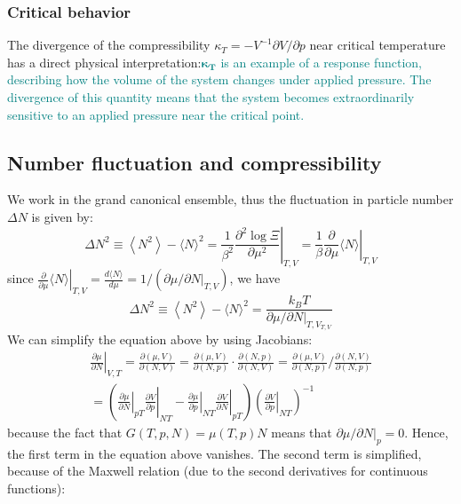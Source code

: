\documentclass[12pt,titlepage]{article}
\newcommand{\tealp}[1]{\textcolor{teal}{#1}}
\numberwithin{equation}{section}
\begin{document}
\subsubsection{Critical behavior}
The divergence of the compressibility $\kappa_{T}=-V^{-1} \partial V / \partial p$ near critical temperature has a direct physical interpretation:\tealp{$\boldsymbol{\kappa}_{\boldsymbol{T}}$ is an example of a response function\index{response function}, describing how the volume of the system changes under applied pressure. The divergence of this quantity means that the system becomes extraordinarily sensitive to an applied pressure near the critical point.}

\subsection{Number fluctuation and compressibility}
We work in the grand canonical ensemble, thus the fluctuation in particle number $\Delta N$ is given by:
\begin{equation}
\Delta N^{2} \equiv\left\langle N^{2}\right\rangle-\langle N\rangle^{2}=\left.\frac{1}{\beta^{2}} \frac{\partial^{2} \log \Xi}{\partial \mu^{2}}\right|_{T, V}=\left.\frac{1}{\beta} \frac{\partial}{\partial \mu}\langle N\rangle\right|_{T, V}
\end{equation}
since $\left.\frac{\partial}{\partial \mu}\langle N\rangle\right|_{T, V}=\frac{d\langle N\rangle}{d \mu}=1/(\left.\partial \mu / \partial N\right|_{T, V})$, we have
\begin{equation}
\Delta N^{2} \equiv\left\langle N^{2}\right\rangle-\langle N\rangle^{2}=\frac{k_{B} T}{\left.\partial \mu / \partial N\right|_{T, V_ { T , V }}}
\end{equation}
We can simplify the equation above by using Jacobians:
\begin{multline}
    \left.\frac{\partial \mu}{\partial N}\right|_{V, T} =\frac{\partial(\mu, V)}{\partial(N, V)} =\frac{\partial(\mu, V)}{\partial(N, p)} \cdot \frac{\partial(N, p)}{\partial(N, V)} =\frac{\partial(\mu, V)}{\partial(N, p)} / \frac{\partial(N, V)}{\partial(N, p)}\\
     =\left(\left.\left.\frac{\partial \mu}{\partial N}\right|_{p T} \frac{\partial V}{\partial p}\right|_{N T}-\left.\left.\frac{\partial \mu}{\partial p}\right|_{N T} \frac{\partial V}{\partial N}\right|_{p T}\right)\left(\left.\frac{\partial V}{\partial p}\right|_{N T}\right)^{-1}
\end{multline}
because the fact that $G(T, p, N)=\mu(T, p) N$ means that $\left.\partial \mu / \partial N\right|_{p}=0 .$ Hence, the first term in the equation above vanishes. The second term is simplified, because of the Maxwell relation (due to the second derivatives for continuous functions):
\end{document}
